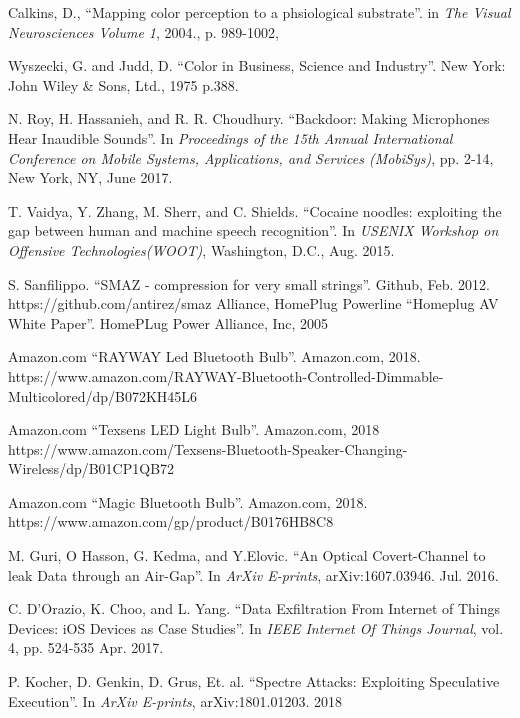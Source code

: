 \documentclass[conference]{IEEEtran}
\begin{document}
\begin{thebibliography}{00}
 Calkins, D., ``Mapping color perception to a phsiological substrate''. in \textit{The Visual Neurosciences Volume 1},  2004., p. 989-1002,

 Wyszecki, G. and Judd, D. ``Color in Business, Science and Industry''. New York: John Wiley \& Sons, Ltd., 1975 p.388.

 N. Roy, H. Hassanieh, and R. R. Choudhury.  ``Backdoor: Making Microphones Hear Inaudible Sounds''. In \textit{Proceedings of the 15th Annual International Conference on Mobile Systems, Applications, and Services (MobiSys)}, pp. 2-14, New York, NY, June 2017.

 T. Vaidya, Y. Zhang, M. Sherr, and C. Shields. ``Cocaine noodles: exploiting the gap between human and machine speech recognition''. In \textit{USENIX Workshop on Offensive Technologies(WOOT)}, Washington, D.C., Aug. 2015.

 S. Sanfilippo. ``SMAZ - compression for very small strings''. Github, Feb. 2012. https://github.com/antirez/smaz
 Alliance, HomePlug Powerline ``Homeplug AV White Paper''. HomePLug Power Alliance, Inc, 2005

 Amazon.com ``RAYWAY Led Bluetooth Bulb''. Amazon.com, 2018. https://www.amazon.com/RAYWAY-Bluetooth-Controlled-Dimmable-Multicolored/dp/B072KH45L6

 Amazon.com ``Texsens LED Light Bulb''. Amazon.com, 2018 https://www.amazon.com/Texsens-Bluetooth-Speaker-Changing-Wireless/dp/B01CP1QB72

 Amazon.com ``Magic Bluetooth Bulb''. Amazon.com, 2018. https://www.amazon.com/gp/product/B0176HB8C8

 M. Guri, O Hasson, G. Kedma, and Y.Elovic. ``An Optical Covert-Channel to leak Data through an Air-Gap''. In \textit{ArXiv E-prints}, arXiv:1607.03946. Jul. 2016.

 C. D'Orazio, K. Choo, and L. Yang. ``Data Exfiltration From Internet of Things Devices: iOS Devices as Case Studies''. In \textit{IEEE Internet Of Things Journal}, vol. 4, pp. 524-535 Apr. 2017.

 P. Kocher, D. Genkin, D. Grus, Et. al. ``Spectre Attacks: Exploiting Speculative Execution''. In \textit{ArXiv E-prints}, arXiv:1801.01203. 2018

\end{thebibliography}
\vspace{12pt}
\end{document}
